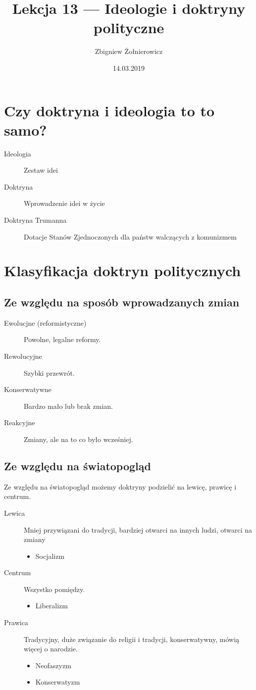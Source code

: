 \documentclass{article}
\begin{document}
\title{Lekcja 13 --- Ideologie i doktryny polityczne}
\author{Zbigniew Żołnierowicz}
\date{14.03.2019}
\maketitle
\section{Czy doktryna i ideologia to to samo?}
\begin{description}
  \item[Ideologia] Zestaw idei
  \item[Doktryna] Wprowadzenie idei w życie
  \item[Doktryna Trumanna] Dotacje Stanów Zjednoczonych dla państw walczących z komunizmem
\end{description}
\section{Klasyfikacja doktryn politycznych}
\subsection{Ze względu na sposób wprowadzanych zmian}
\begin{description}
  \item[Ewolucjne (reformistyczne)] Powolne, legalne reformy.
  \item[Rewolucyjne] Szybki przewrót.
  \item[Konserwatywne] Bardzo mało lub brak zmian.
  \item[Reakcyjne] Zmiany, ale na to co było wcześniej.
\end{description}
\subsection{Ze względu na światopogląd}
Ze względu na światopogląd możemy doktryny podzielić na lewicę, prawicę i centrum.
\begin{description}
  \item[Lewica] Mniej przywiązani do tradycji, bardziej otwarci na innych ludzi, otwarci na zmiany
    \begin{itemize}
      \item Socjalizm
    \end{itemize}
  \item[Centrum] Wszystko pomiędzy.
    \begin{itemize}
      \item Liberalizm
    \end{itemize}
  \item[Prawica] Tradycyjny, duże związanie do religii i tradycji, konserwatywny, mówią więcej o narodzie.
    \begin{itemize}
      \item Neofaszyzm
      \item Konserwatyzm
    \end{itemize}
\end{description}
\end{document}
